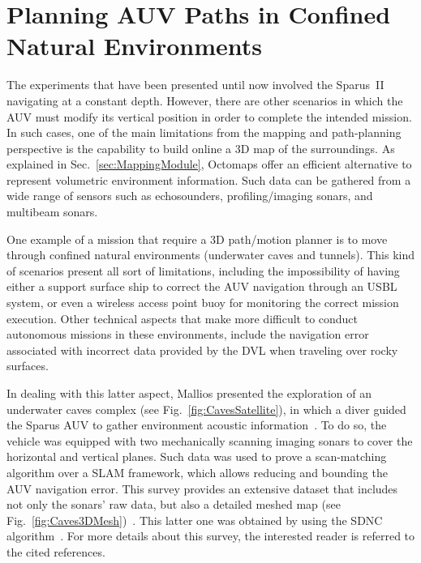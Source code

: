 \section{Planning AUV Paths in Confined Natural Environments}
\label{sec:caves_experiments}

The experiments that have been presented until now involved the Sparus~II
navigating at a constant depth. However, there are other scenarios in which the
\ac{AUV} must modify its vertical position in order to complete the intended
mission. In such cases, one of the main limitations from the mapping and
path-planning perspective is the capability to build online a \ac{3D} map of the
surroundings. As explained in Sec.~\ref{sec:MappingModule}, Octomaps offer an
efficient alternative to represent volumetric environment information. Such data
can be gathered from a wide range of sensors such as echosounders,
profiling/imaging sonars, and multibeam sonars.

One example of a mission that require a \ac{3D} path/motion planner is to move
through confined natural environments (\eg underwater caves and tunnels). This
kind of scenarios present all sort of limitations, including the impossibility
of having either a support surface ship to correct the \ac{AUV} navigation
through an \ac{USBL} system, or even a wireless access point buoy for monitoring
the correct mission execution. Other technical aspects that make more difficult
to conduct autonomous missions in these environments, include the navigation
error associated with incorrect data provided by the \ac{DVL} when traveling
over rocky surfaces.

In dealing with this latter aspect, Mallios \etal presented the exploration of
an underwater caves complex (see Fig.~\ref{fig:CavesSatellite}), in which a
diver guided the Sparus \ac{AUV} to gather environment acoustic
information~\cite{Mallios2015}. To do so, the vehicle was equipped with two
mechanically scanning imaging sonars to cover the horizontal and vertical
planes. Such data was used to prove a scan-matching algorithm over a \acf{SLAM}
framework, which allows reducing and bounding the \ac{AUV} navigation error.
This survey provides an extensive dataset that includes not only the sonars' raw
data, but also a detailed meshed map (see
Fig.~\ref{fig:Caves3DMesh})~\cite{Mallios2015,Mallios2017}. This latter one was
obtained by using the \ac{SDNC} algorithm~\cite{Campos2013}. For more details
about this survey, the interested reader is referred to the cited references.

